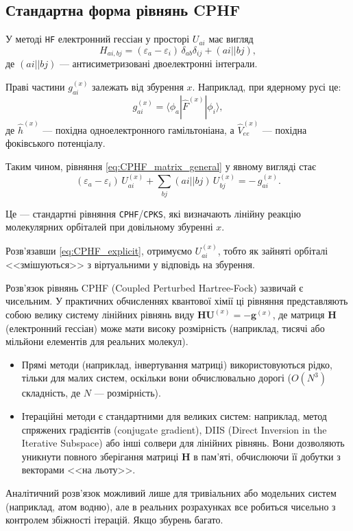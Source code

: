 \subsection{Стандартна форма рівнянь CPHF}

У методі \texttt{HF} електронний гессіан у просторі $U_{ai}$ має вигляд
\begin{equation}\label{eq:H_standard}
	H_{ai,bj}
	=
	(\varepsilon_a - \varepsilon_i)\,\delta_{ab}\delta_{ij}
	+ (ai||bj),
\end{equation}
де $(ai||bj)$ --- антисиметризовані двоелектронні інтеграли.

Праві частини $g_{ai}^{(x)}$ залежать від збурення $x$.
Наприклад, при ядерному русі це:
\[
	g_{ai}^{(x)} = \langle \phi_a | \hat F^{(x)} | \phi_i \rangle,
\]
де $\hat h^{(x)}$ --- похідна одноелектронного гамільтоніана,
а $\hat V^{(x)}_{ee}$ --- похідна фоківського потенціалу.

Таким чином, рівняння \eqref{eq:CPHF_matrix_general} у явному вигляді стає
\begin{equation}\label{eq:CPHF_explicit}
	(\varepsilon_a - \varepsilon_i)\,U_{ai}^{(x)}
	+ \sum_{b j} (ai||bj)\,U_{bj}^{(x)}
	= -\,g_{ai}^{(x)}.
\end{equation}

Це --- стандартні рівняння \texttt{CPHF}/\texttt{CPKS}, які визначають
лінійну реакцію молекулярних орбіталей при довільному збуренні $x$.


Розв'язавши \eqref{eq:CPHF_explicit}, отримуємо $U_{ai}^{(x)}$,
тобто як зайняті орбіталі <<змішуються>> з віртуальними у відповідь на збурення.

\begin{commentbox}
	Розв'язок рівнянь CPHF (Coupled Perturbed Hartree-Fock) зазвичай є чисельним. У практичних обчисленнях квантової хімії ці рівняння представляють собою велику систему лінійних рівнянь виду $\mathbf{H} \mathbf{U}^{(x)} = -\mathbf{g}^{(x)}$, де матриця $\mathbf{H}$ (електронний гессіан) може мати високу розмірність (наприклад, тисячі або мільйони елементів для реальних молекул).

	\begin{itemize}
		\item Прямі методи (наприклад, інвертування матриці) використовуються рідко, тільки для малих систем, оскільки вони обчислювально дорогі ($O(N^3)$ складність, де $N$ --- розмірність).
		\item Ітераційні методи є стандартними для великих систем: наприклад, метод спряжених градієнтів (conjugate gradient), DIIS (Direct Inversion in the Iterative Subspace) або інші солвери для лінійних рівнянь. Вони дозволяють уникнути повного зберігання матриці $\mathbf{H}$ в пам'яті, обчислюючи її добутки з векторами <<на льоту>>.
	\end{itemize}

	Аналітичний розв'язок можливий лише для тривіальних або модельних систем (наприклад, атом водню), але в реальних розрахунках все робиться чисельно з контролем збіжності ітерацій. Якщо збурень багато.
\end{commentbox}

